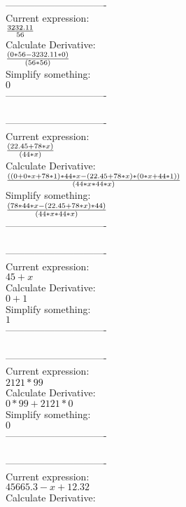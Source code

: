 \documentclass[12pt]{article}
\begin{document}
\\
-------------------------------\\
Current expression:\\
\( {{3232.11}\over{56}}\) \\
Calculate Derivative:\\
\( {{(0*56-3232.11*0)}\over{(56*56)}}\) \\
Simplify something:\\
\( 0\) \\
-------------------------------\\
\\
-------------------------------\\
Current expression:\\
\( {{(22.45+78*x)}\over{(44*x)}}\) \\
Calculate Derivative:\\
\( {{((0+0*x+78*1)*44*x-(22.45+78*x)*(0*x+44*1))}\over{(44*x*44*x)}}\) \\
Simplify something:\\
\( {{(78*44*x-(22.45+78*x)*44)}\over{(44*x*44*x)}}\) \\
-------------------------------\\
\\
-------------------------------\\
Current expression:\\
\( 45+x\) \\
Calculate Derivative:\\
\( 0+1\) \\
Simplify something:\\
\( 1\) \\
-------------------------------\\
\\
-------------------------------\\
Current expression:\\
\( 2121*99\) \\
Calculate Derivative:\\
\( 0*99+2121*0\) \\
Simplify something:\\
\( 0\) \\
-------------------------------\\
\\
-------------------------------\\
Current expression:\\
\( 45665.3-x+12.32\) \\
Calculate Derivative:\\
\end{document}
